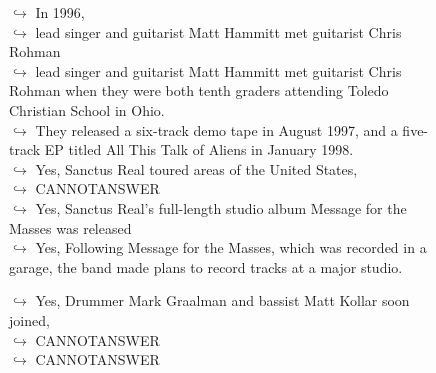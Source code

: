 \documentclass[11pt,a4paper, onecolumn]{article}
\begin{document}
\begin{figure}[t] \small \begin{tcolorbox}[boxsep=0pt,left=5pt,right=0pt,top=2pt,colback = yellow!5] \begin{dialogue}
 \small 
\colorbox{pink!25}{$\hookrightarrow$}
{ In 1996, }
\\
\colorbox{pink!25}{$\hookrightarrow$}
{ lead singer and guitarist Matt Hammitt met guitarist Chris Rohman }
\\
\colorbox{pink!25}{$\hookrightarrow$}
{ lead singer and guitarist Matt Hammitt met guitarist Chris Rohman when they were both tenth graders attending Toledo Christian School in Ohio. }
\\
\colorbox{pink!25}{$\hookrightarrow$}
{ They released a six-track demo tape in August 1997, and a five-track EP titled All This Talk of Aliens in January 1998. }
\\
\colorbox{pink!25}{$\hookrightarrow$}
\colorbox{red!25}{Yes,}
{ Sanctus Real toured areas of the United States, }
\\
\colorbox{pink!25}{$\hookrightarrow$}
{ CANNOTANSWER }
\\
\colorbox{pink!25}{$\hookrightarrow$}
\colorbox{red!25}{Yes,}
{ Sanctus Real's full-length studio album Message for the Masses was released }
\\
\colorbox{pink!25}{$\hookrightarrow$}
\colorbox{red!25}{Yes,}
{ Following Message for the Masses, which was recorded in a garage, the band made plans to record tracks at a major studio. }
 \end{dialogue}\end{tcolorbox}\end{figure}\begin{figure}[t] \small \begin{tcolorbox}[boxsep=0pt,left=5pt,right=0pt,top=2pt,colback = yellow!5] \begin{dialogue}
 \small 
\colorbox{pink!25}{$\hookrightarrow$}
\colorbox{red!25}{Yes,}
{ Drummer Mark Graalman and bassist Matt Kollar soon joined, }
\\
\colorbox{pink!25}{$\hookrightarrow$}
{ CANNOTANSWER }
\\
\colorbox{pink!25}{$\hookrightarrow$}
{ CANNOTANSWER }
\\
 \end{dialogue}\end{tcolorbox}\end{figure}
\end{document}
